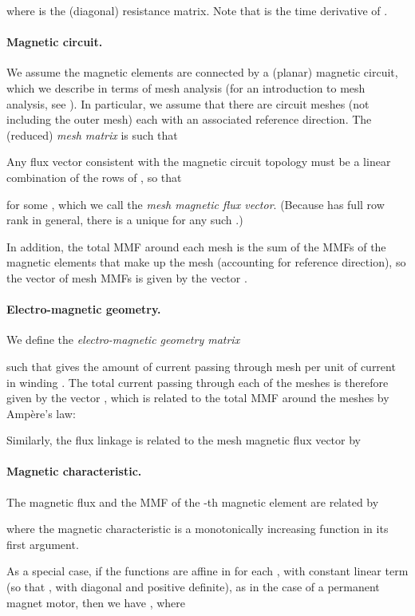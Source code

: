 \documentclass[11pt]{article}
\begin{document}
where  is the (diagonal) resistance matrix.
Note that  is the time derivative of .


\paragraph{Magnetic circuit.}
We assume the magnetic elements are connected by a (planar) magnetic circuit,
which we describe in terms of mesh analysis
(for an introduction to mesh analysis, see \cite{desoer1984basic}).
In particular, we assume that there are  circuit meshes
(not including the outer mesh)
each with an associated reference direction.
The (reduced) \emph{mesh matrix} 
is such that 

Any flux vector  consistent with the magnetic circuit topology
must be a linear combination of the rows of , so that

for some ,
which we call the \emph{mesh magnetic flux vector}.
(Because  has full row rank in general, 
there is a unique  for any such .)

In addition, the total MMF around each mesh 
is the sum of the MMFs of the magnetic elements
that make up the mesh (accounting for reference direction),
so the vector of mesh MMFs is given by the vector .

\paragraph{Electro-magnetic geometry.}
We define the \emph{electro-magnetic geometry matrix}

such that  gives the amount of current passing through
mesh  per unit of current in winding .
The total current passing through each of the  meshes is therefore
given by the vector ,
which is related to the total MMF around the meshes by Amp\`ere's law:

Similarly, the flux linkage is related to the mesh magnetic flux vector by



\paragraph{Magnetic characteristic.}
The magnetic flux and the MMF of the -th magnetic element are related by

where the magnetic characteristic  
is a monotonically increasing function in its first argument. 

As a special case, if the functions  are affine in 
for each , with constant linear term
(so that ,
with  diagonal and positive definite),
as in the case of a permanent magnet motor,
then 
we have ,
where 
\end{document}
